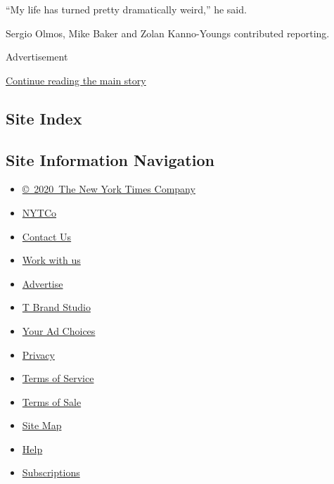 ``My life has turned pretty dramatically weird,'' he said.

Sergio Olmos, Mike Baker and Zolan Kanno-Youngs contributed reporting.

Advertisement

\protect\hyperlink{after-bottom}{Continue reading the main story}

\hypertarget{site-index}{%
\subsection{Site Index}\label{site-index}}

\hypertarget{site-information-navigation}{%
\subsection{Site Information
Navigation}\label{site-information-navigation}}

\begin{itemize}
\tightlist
\item
  \href{https://help.nytimes.com/hc/en-us/articles/115014792127-Copyright-notice}{©~2020~The
  New York Times Company}
\end{itemize}

\begin{itemize}
\tightlist
\item
  \href{https://www.nytco.com/}{NYTCo}
\item
  \href{https://help.nytimes.com/hc/en-us/articles/115015385887-Contact-Us}{Contact
  Us}
\item
  \href{https://www.nytco.com/careers/}{Work with us}
\item
  \href{https://nytmediakit.com/}{Advertise}
\item
  \href{http://www.tbrandstudio.com/}{T Brand Studio}
\item
  \href{https://www.nytimes.com/privacy/cookie-policy\#how-do-i-manage-trackers}{Your
  Ad Choices}
\item
  \href{https://www.nytimes.com/privacy}{Privacy}
\item
  \href{https://help.nytimes.com/hc/en-us/articles/115014893428-Terms-of-service}{Terms
  of Service}
\item
  \href{https://help.nytimes.com/hc/en-us/articles/115014893968-Terms-of-sale}{Terms
  of Sale}
\item
  \href{https://spiderbites.nytimes.com}{Site Map}
\item
  \href{https://help.nytimes.com/hc/en-us}{Help}
\item
  \href{https://www.nytimes.com/subscription?campaignId=37WXW}{Subscriptions}
\end{itemize}
